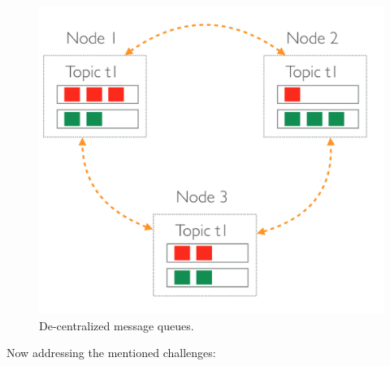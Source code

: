 \begin{figure}[H]
	\centering
	\includegraphics[scale=0.3]{images/de-message-queues.png}
	\caption{De-centralized message queues.}
	\label{fig:de-message-queues}
\end{figure}
 Now addressing the mentioned challenges:

